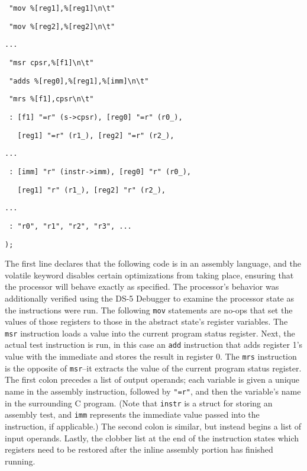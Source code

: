 \documentclass[letterpaper,12pt]{article}
\begin{document}
\texttt{\ "mov \%[reg1],\%[reg1]\textbackslash n\textbackslash t"}

\texttt{\ "mov \%[reg2],\%[reg2]\textbackslash n\textbackslash t"}

\texttt{...}

\texttt{\ "msr cpsr,\%[f1]\textbackslash n\textbackslash t"}

\texttt{\ "adds \%[reg0],\%[reg1],\%[imm]\textbackslash n\textbackslash t"}

\texttt{\ "mrs \%[f1],cpsr\textbackslash n\textbackslash t"}
                
\texttt{\ : [f1] "=r" (s->cpsr), [reg0] "=r" (r0\_),}

\texttt{\ \ \ [reg1] "=r" (r1\_), [reg2] "=r" (r2\_),}

\texttt{...}

\texttt{\ : [imm] "r" (instr->imm), [reg0] "r" (r0\_),}

\texttt{\ \ \ [reg1] "r" (r1\_), [reg2] "r" (r2\_),}

\texttt{...}

\texttt{\ : "r0", "r1", "r2", "r3", ...}
            
\texttt{);}

The first line declares that the following code is in an assembly language, and the volatile keyword disables certain optimizations from taking place, ensuring that the processor will behave exactly as specified. The processor's behavior was additionally verified using the DS-5 Debugger\cite{Debug} to examine the processor state as the instructions were run. The following \texttt{mov} statements are no-ops that set the values of those registers to those in the abstract state's register variables. The \texttt{msr} instruction loads a value into the current program status register. Next, the actual test instruction is run, in this case an \texttt{add} instruction that adds register 1's value with the immediate and stores the result in register 0. The \texttt{mrs} instruction is the opposite of \texttt{msr}--it extracts the value of the current program status register. The first colon precedes a list of output operands; each variable is given a unique name in the assembly instruction, followed by \texttt{"=r"}, and then the variable's name in the surrounding C program. (Note that \texttt{instr} is a struct for storing an assembly test, and \texttt{imm} represents the immediate value passed into the instruction, if applicable.) The second colon is similar, but instead begins a list of input operands. Lastly, the clobber list at the end of the instruction states which registers need to be restored after the inline assembly portion has finished running.
\end{document}
